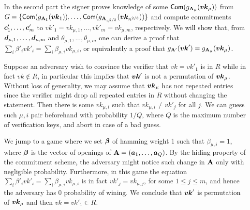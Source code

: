 In the second part the signer proves knowledge of some $\mathsf{Com}(g_{\mathbf{{A}}_\mu}({\boldsymbol{vk}}_\mu))$ from $G = \{\mathsf{Com}(g_{\mathbf{{A}}_1}({\boldsymbol{vk}}_1)),\allowbreak\ldots,\mathsf{Com}(g_{\mathbf{{A}}_{n^{2/3}}}({\boldsymbol{vk}}_{n^{2/3}}))\}$ and  compute commitments ${\boldsymbol{c}}'_1,\allowbreak\ldots,{\boldsymbol{c}}'_m$ to $vk'_1=vk_{\mu,1},\ldots,vk'_m=vk_{\mu,m}$, respectively. We will show that, from ${\boldsymbol{d}}_{\mu,1},\ldots,{\boldsymbol{d}}_{\mu,m}$ and $\theta_{\mu,1},\ldots,\theta_{\mu,m}$ one can derive a proof that $\sum_i \beta'_i vk'_i  = \sum_{i} \beta_{\mu,i}vk_{\mu,i}$, or equivalently a proof that $g_{\mathbf{{A}}'}({\boldsymbol{vk}}') = g_{\mathbf{{A}}_\mu}({\boldsymbol{vk}}_\mu)$.


Suppose an adversary wish to convince the verifier that $vk=vk'_1$ is in $R$ while in fact $vk\notin R$, in particular this implies that ${\boldsymbol{vk}}'$ is not a permutation of ${\boldsymbol{vk}}_\mu$. Without loss of generality, we may assume that ${\boldsymbol{vk}}_\mu$ has not repeated entries since the verifier might drop all repeated entries in $R$ without changing the statement. Then there is some $vk_{\mu,i}$ such that $vk_{\mu,i}\neq vk'_j$ for all $j$.
We can guess such $\mu,i$ pair beforehand with probability $1/Q$, where $Q$ is the maximum number of verification keys, and abort in case of a bad guess.

We jump to a game where we set ${\boldsymbol{\beta}}$ of
 hamming weight 1 such that $\beta_{\mu,i}=1$, where ${\boldsymbol{\beta}}$ is the vector of openings of $\mathbf{{A}} = ({\boldsymbol{a}}_1,\ldots,{\boldsymbol{a}}_Q)$.
By the hiding property of the commitment scheme, the adversary might notice such change in $\mathbf{{A}}$ only with negligible probability. Furthermore, in this game the equation $\sum_{i}\beta'_i vk'_i = \sum_{i}\beta_{\mu,i} vk_{\mu,i}$ is in fact $vk'_j = vk_{\mu,j}$, for some $1\leq j \leq m$, and hence the adversary has 0 probability of wining. We conclude that ${\boldsymbol{vk}}'$ is  permutation of ${\boldsymbol{vk}}_{\mu}$ and then $vk = vk'_1\in R$.


